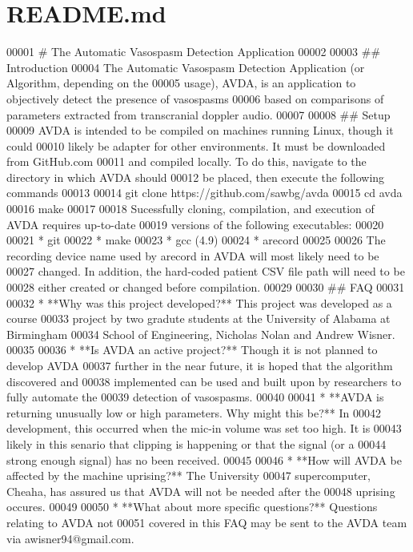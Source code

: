\hypertarget{README_8md_source}{\section{R\+E\+A\+D\+M\+E.\+md}
}

\begin{DoxyCode}
00001 # The Automatic Vasospasm Detection Application
00002 
00003 ## Introduction
00004 The Automatic Vasospasm Detection Application (or Algorithm, depending on the
00005 usage), AVDA, is an application to objectively detect the presence of vasospasms
00006 based on comparisons of parameters extracted from transcranial doppler audio.
00007 
00008 ## Setup
00009 AVDA is intended to be compiled on machines running Linux, though it could
00010 likely be adapter for other environments. It must be downloaded from GitHub.com
00011 and compiled locally. To do this, navigate to the directory in which AVDA should
00012 be placed, then execute the following commands
00013 
00014    git clone https://github.com/sawbg/avda
00015    cd avda
00016    make
00017 
00018 Sucessfully cloning, compilation, and execution of AVDA requires up-to-date
00019 versions of the following executables:
00020 
00021 * git
00022 * make
00023 * gcc (4.9)
00024 * arecord
00025 
00026 The recording device name used by arecord in AVDA will most likely need to be
00027 changed. In addition, the hard-coded patient CSV file path will need to be
00028 either created or changed before compilation.
00029 
00030 ## FAQ
00031 
00032 * **Why was this project developed?** This project was developed as a course 
00033 project by two gradute students at the University of Alabama at Birmingham
00034 School of Engineering, Nicholas Nolan and Andrew Wisner.
00035 
00036 * **Is AVDA an active project?** Though it is not planned to develop AVDA
00037 further in the near future, it is hoped that the algorithm discovered and
00038 implemented can be used and built upon by researchers to fully automate the
00039 detection of vasospasms.
00040 
00041 * **AVDA is returning unusually low or high parameters. Why might this be?** In
00042   development, this occurred when the mic-in volume was set too high. It is
00043 likely in this senario that clipping is happening or that the signal (or a
00044 strong enough signal) has no been received.
00045 
00046 * **How will AVDA be affected by the machine uprising?** The University
00047   supercomputer, Cheaha, has assured us that AVDA will not be needed after the
00048 uprising occures.
00049 
00050 * **What about more specific questions?** Questions relating to AVDA not
00051 covered in this FAQ may be sent to the AVDA team via awisner94@gmail.com.
\end{DoxyCode}
